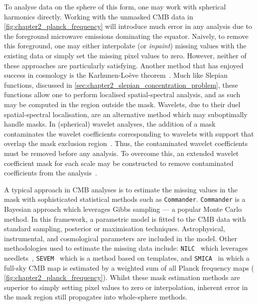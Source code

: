 To analyse data on the sphere of this form, one may work with spherical harmonics directly.
Working with the unmasked CMB data in \cref{fig:chapter2_planck_frequency} will introduce much error in any analysis due to the foreground microwave emissions dominating the equator.
Naively, to remove this foreground, one may either interpolate (or \emph{inpaint}) missing values with the existing data or simply set the missing pixel values to zero.
However, neither of these approaches are particularly satisfying.
Another method that has enjoyed success in cosmology is the Karhunen-Loève theorem~\cite{Tegmark1997,Bond1994,Bunn1995}.
Much like Slepian functions, discussed in \cref{sec:chapter2_slepian_concentration_problem}, these functions allow one to perform localised spatial-spectral analysis, and as such may be computed in the region outside the mask.
Wavelets, due to their duel spatial-spectral localisation, are an alternative method which may suboptimally handle masks.
In (spherical) wavelet analyses, the addition of a mask contaminates the wavelet coefficients corresponding to wavelets with support that overlap the mask exclusion region~\cite{Vielva2004,McEwen2004}.
Thus, the contaminated wavelet coefficients must be removed before any analysis.
To overcome this, an extended wavelet coefficient mask for each scale may be constructed to remove contaminated coefficients from the analysis~\cite{McEwen2007a}.

A typical approach in CMB analyses is to estimate the missing values in the mask with sophisticated statistical methods such as \texttt{Commander}.
\texttt{Commander} is a Bayesian approach which leverages Gibbs sampling --- a popular Monte Carlo method.
In this framework, a parametric model is fitted to the CMB data with standard sampling, posterior or maximisation techniques.
Astrophysical, instrumental, and cosmological parameters are included in the model.
Other methodologies used to estimate the missing data include: \texttt{NILC}~\cite{Basak2011,Basak2013,Planck2016,Planck2020a} which leverages needlets~\cite{Narcowich2006}, \texttt{SEVEM}~\cite{Leach2008,FernandezCobos2012,Planck2016,Planck2020a} which is a method based on templates, and \texttt{SMICA}~\cite{Cardoso2008,Planck2016,Planck2020a} in which a full-sky CMB map is estimated by a weighted sum of all Planck frequency maps (\cf{} \cref{fig:chapter2_planck_frequency}).
Whilst these mask estimation methods are superior to simply setting pixel values to zero or interpolation, inherent error in the mask region still propagates into whole-sphere methods.

